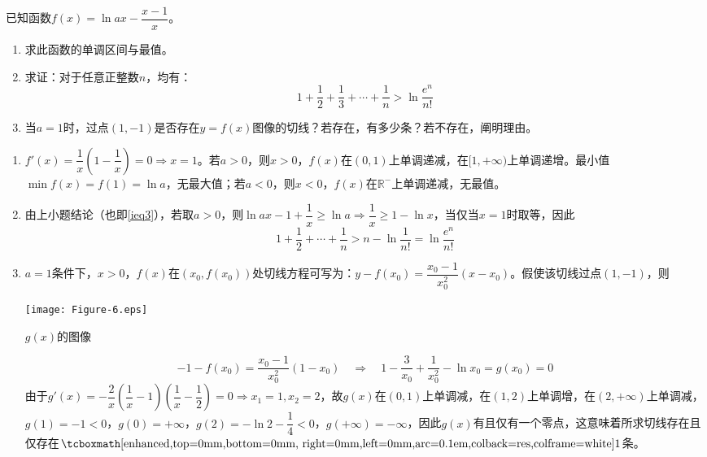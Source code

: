 \begin{que}
	已知函数$f(x)=\ln ax-\dfrac{x-1}{x}$。
	\begin{enumerate}
		\item 求此函数的单调区间与最值。
		\item 求证：对于任意正整数$n$，均有：$$1+\dfrac{1}{2}+\dfrac{1}{3}+\cdots+\dfrac{1}{n}> \ln\dfrac{e^n}{n!}$$
		\item 当$a=1$时，过点$(1,-1)$是否存在$y=f(x)$图像的切线？若存在，有多少条？若不存在，阐明理由。
	\end{enumerate}
\end{que}
\sol 	\begin{enumerate}
	\item $f'(x)=\dfrac{1}{x}\left(1-\dfrac{1}{x}\right)=0 \Rightarrow x=1$。若$a>0$，则$x>0$，$f(x)$在$(0,1)$上单调递减，在$[1,+\infty)$上单调递增。最小值$\min f(x)=f(1)=\ln a$，无最大值；若$a<0$，则$x<0$，$f(x)$在$\mathbb{R}^-$上单调递减，无最值。
	\item 由上小题结论（也即\ref{ieq3}），若取$a>0$，则$\ln ax-1+\dfrac{1}{x}\geqslant\ln a\Rightarrow \dfrac{1}{x}\geqslant 1-\ln x$，当仅当$x=1$时取等，因此$$1+\dfrac{1}{2}+\cdots+\dfrac{1}{n}> n-\ln\dfrac{1}{n!}=\ln\dfrac{e^n}{n!}$$
	\item $a=1$条件下，$x>0$，$f(x)$在$(x_0,f(x_0))$处切线方程可写为：$y-f(x_0)=\dfrac{x_0-1}{x_0^2}(x-x_0)$。假使该切线过点$(1,-1)$，则	
	\begin{marginfigure}
		\texttt{[image: Figure-6.eps]}
		\caption{$g(x)$的图像}
	\end{marginfigure}$$-1-f(x_0)=\dfrac{x_0-1}{x_0^2}(1-x_0)\quad\Rightarrow\quad1-\dfrac{3}{x_0}+\dfrac{1}{x_0^2}-\ln x_0=g(x_0)=0$$
	由于$g'(x)=-\dfrac{2}{x}\left(\dfrac{1}{x}-1\right)\left(\dfrac{1}{x}-\dfrac{1}{2}\right)=0\Rightarrow x_1=1,x_2=2$，故$g(x)$在$(0,1)$上单调减，在$(1,2)$上单调增，在$(2,+\infty)$上单调减，$g(1)=-1<0$，$g(0)=+\infty$，$g(2)=-\ln 2-\dfrac{1}{4}<0$，$g(+\infty)=-\infty$，因此$g(x)$有且仅有一个零点，这意味着所求切线存在且仅存在$\res{1}$条。
\end{enumerate}\par\hfill{}\easy

